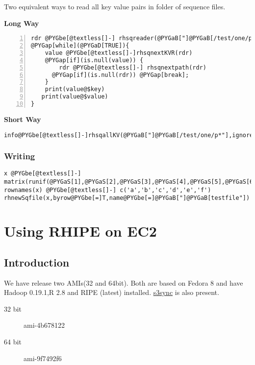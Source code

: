 \documentclass[letterpaper,10pt,english]{manual}
\begin{document}
Two equivalent ways to read all key value pairs in folder of sequence files.

\textbf{Long Way}

\begin{Verbatim}[commandchars=@\[\],numbers=left,firstnumber=1,stepnumber=1]
rdr @PYGbe[@textless[]-] rhsqreader(@PYGaB["]@PYGaB[/test/one/p*"])
@PYGap[while](@PYGaD[TRUE]){
    value @PYGbe[@textless[]-]rhsqnextKVR(rdr)
    @PYGap[if](is.null(value)) {
        rdr @PYGbe[@textless[]-] rhsqnextpath(rdr)
      @PYGap[if](is.null(rdr)) @PYGap[break];
    }
    print(value@$key)
   print(value@$value)
}
\end{Verbatim}

\textbf{Short Way}

\begin{Verbatim}[commandchars=@\[\]]
info@PYGbe[@textless[]-]rhsqallKV(@PYGaB["]@PYGaB[/test/one/p*"],ignore@PYGbe[=]F)
\end{Verbatim}


\subsection{Writing}

\begin{Verbatim}[commandchars=@\[\]]
x @PYGbe[@textless[]-] matrix(runif(@PYGaS[1],@PYGaS[2],@PYGaS[3],@PYGaS[4],@PYGaS[5],@PYGaS[6]),ncol@PYGbe[=]@PYGaS[2])
rownames(x) @PYGbe[@textless[]-] c('a','b','c','d','e','f')
rhnewSqfile(x,byrow@PYGbe[=]T,name@PYGbe[=]@PYGaB["]@PYGaB[testfile"])
\end{Verbatim}

\resetcurrentobjects
\hypertarget{--doc-ec2}{}

\chapter{Using RHIPE on EC2}


\section{Introduction}

We have release two AMIs(32 and 64bit). Both are based on Fedora 8 and have
Hadoop 0.19.1,R 2.8 and RIPE (latest) installed. \href{http://s3sync.net/wiki}{s3sync} is also present.
\begin{description}
\item[32 bit]
ami-4b678122

\item[64 bit]
ami-9f7492f6

\end{description}
\end{document}
